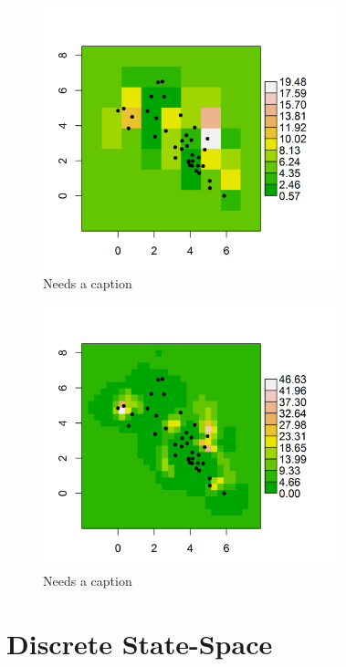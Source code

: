 \begin{figure}
\begin{center}
\includegraphics[height=3in,width=3.375in]{figs/density10x10}
\end{center}
\caption{Needs a caption}
\label{scr0.fig.density10x10}
\end{figure}

\begin{figure}
\begin{center}
\includegraphics[height=3in,width=3.375in]{figs/density30x30}
\end{center}
\caption{Needs a caption}
\label{scr0.fig.density20x20}
\end{figure}

\section{Discrete State-Space}
\label{scr0.sec.discrete}


